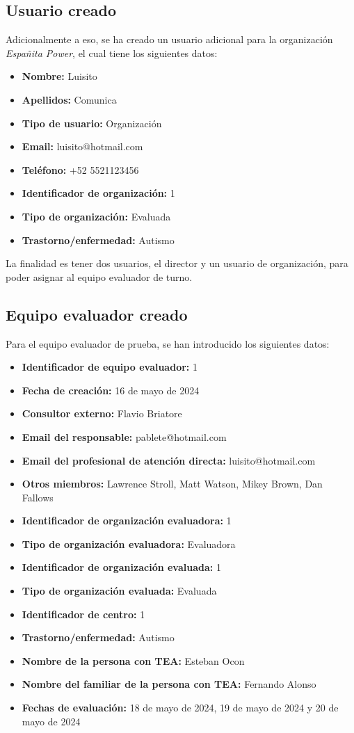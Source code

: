 \subsection{Usuario creado}
Adicionalmente a eso, se ha creado un usuario adicional para la organización \textit{Españita Power}, el cual tiene los siguientes datos:
\begin{itemize}
    \item \textbf{Nombre: }Luisito
    \item \textbf{Apellidos: }Comunica
    \item \textbf{Tipo de usuario: }Organización
    \item \textbf{Email: }luisito@hotmail.com
    \item \textbf{Teléfono: }+52 5521123456
    \item \textbf{Identificador de organización: }1
    \item \textbf{Tipo de organización: }Evaluada
    \item \textbf{Trastorno/enfermedad: }Autismo
\end{itemize}
La finalidad es tener dos usuarios, el director y un usuario de organización,
para poder asignar al equipo evaluador de turno.
\subsection{Equipo evaluador creado}
Para el equipo evaluador de prueba, se han introducido los siguientes datos:
\begin{itemize}
    \item \textbf{Identificador de equipo evaluador: }1
    \item \textbf{Fecha de creación: }16 de mayo de 2024
    \item \textbf{Consultor externo: }Flavio Briatore
    \item \textbf{Email del responsable: }pablete@hotmail.com
    \item \textbf{Email del profesional de atención directa: }luisito@hotmail.com
    \item \textbf{Otros miembros: }Lawrence Stroll, Matt Watson, Mikey Brown, Dan Fallows
    \item \textbf{Identificador de organización evaluadora: }1
    \item \textbf{Tipo de organización evaluadora: }Evaluadora
    \item \textbf{Identificador de organización evaluada: }1
    \item \textbf{Tipo de organización evaluada: }Evaluada
    \item \textbf{Identificador de centro: }1
    \item \textbf{Trastorno/enfermedad: }Autismo
    \item \textbf{Nombre de la persona con TEA: }Esteban Ocon
    \item \textbf{Nombre del familiar de la persona con TEA: }Fernando Alonso
    \item \textbf{Fechas de evaluación: }18 de mayo de 2024, 19 de mayo de 2024 y 20 de mayo de 2024
\end{itemize}
